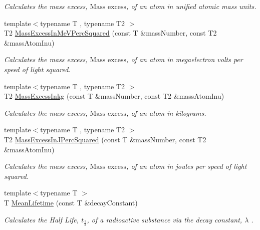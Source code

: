 \begin{DoxyCompactItemize}
\begin{DoxyCompactList}\small\item\em Calculates the mass excess, $\text{Mass excess}$, of an atom in unified atomic mass units. \end{DoxyCompactList}\item 
{\footnotesize template$<$typename T , typename T2 $>$ }\\T2 \mbox{\hyperlink{group___e_g_x_phys-_mass_excess_ga99a93b88df3425b7a153c32c05fa5a88}{Mass\+Excess\+In\+Me\+V\+Perc\+Squared}} (const T \&mass\+Number, const T2 \&mass\+Atom\+Inu)
\begin{DoxyCompactList}\small\item\em Calculates the mass excess, $\text{Mass excess}$, of an atom in megaelectron volts per speed of light squared. \end{DoxyCompactList}\item 
{\footnotesize template$<$typename T , typename T2 $>$ }\\T2 \mbox{\hyperlink{group___e_g_x_phys-_mass_excess_gab72a3640886092be8b9c9662020a2306}{Mass\+Excess\+Inkg}} (const T \&mass\+Number, const T2 \&mass\+Atom\+Inu)
\begin{DoxyCompactList}\small\item\em Calculates the mass excess, $\text{Mass excess}$, of an atom in kilograms. \end{DoxyCompactList}\item 
{\footnotesize template$<$typename T , typename T2 $>$ }\\T2 \mbox{\hyperlink{group___e_g_x_phys-_mass_excess_ga3eb487f438543e950b9c5aece4c5b409}{Mass\+Excess\+In\+J\+Perc\+Squared}} (const T \&mass\+Number, const T2 \&mass\+Atom\+Inu)
\begin{DoxyCompactList}\small\item\em Calculates the mass excess, $\text{Mass excess}$, of an atom in joules per speed of light squared. \end{DoxyCompactList}\item 
{\footnotesize template$<$typename T $>$ }\\T \mbox{\hyperlink{group___e_g_x_phys-_mean_lifetime_gaa9e3c2deedda4bc7a745568b06fc47eb}{Mean\+Lifetime}} (const T \&decay\+Constant)
\begin{DoxyCompactList}\small\item\em Calculates the Half Life, $t_{\frac{1}{2}}$, of a radioactive substance via the decay constant, $\lambda$ . \end{DoxyCompactList}\item 

\end{DoxyCompactItemize}
